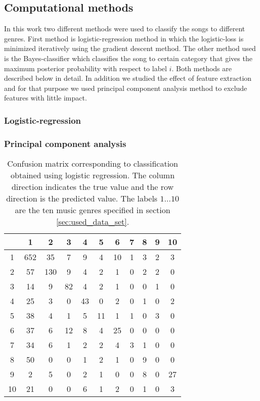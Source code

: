 \documentclass[aps,prb,10pt,twocolumn,groupedaddress]{revtex4-1}
\begin{document}
\subsection{Computational methods}
\label{sec:computational_methods}
In this work two different methods were used to classify the songs to different
genres. First method is logistic-regression method in which the logistic-loss
is minimized iteratively using the gradient descent method.
The other method used is the Bayes-classifier which classifies the song to
certain category that gives the maximum posterior probability with respect to
label $i$. Both methods are described below in detail. In addition we studied
the effect of feature extraction and for that purpose we used principal
component analysis method to exclude features with little impact. 
\subsubsection{Logistic-regression}

\subsubsection{Principal component analysis}

\begin{center}
  \begin{table}
    \caption{Confusion matrix corresponding to classification obtained using
      logistic regression. The column direction indicates the true value and
      the row direction is the predicted value.  The labels $1\ldots10$ are
      the ten music genres specified in section \ref{sec:used_data_set}.}
    \begin{tabular*}{0.45\textwidth}{@{\extracolsep{\fill}}c|cccccccccc}
        & 1 & 2 & 3 & 4 & 5 & 6 & 7 & 8 & 9 & 10\\
      \hline
      1 & 652 & 35 & 7 & 9 & 4 & 10 & 1 & 3 & 2 & 3\\
      2 & 57 & 130 & 9 & 4 & 2 & 1 & 0 & 2 & 2 & 0\\
      3 & 14 & 9 & 82 & 4 & 2 & 1 & 0 & 0 & 1 & 0 \\
      4 & 25 & 3 & 0 & 43 & 0 & 2 & 0 & 1 & 0 & 2 \\
      5 & 38 & 4 & 1 & 5 & 11 & 1 & 1 & 0 & 3 & 0 \\
      6 & 37 & 6 & 12 & 8 & 4 & 25 & 0 & 0 & 0 & 0 \\
      7 & 34 & 6 & 1 & 2 & 2 & 4 & 3 & 1 & 0 & 0 \\
      8 & 50 & 0 & 0 & 1 & 2 & 1 & 0 & 9 & 0 & 0 \\
      9 & 2 & 5 & 0 & 2 & 1 & 0 & 0 & 8 & 0 & 27 \\
      10 & 21 & 0 & 0 & 6 & 1 & 2 & 0 & 1 & 0 & 3\\
      \end{tabular*}
    \label{tab:confusion_log_reg}
  \end{table}
\end{center}
\end{document}
